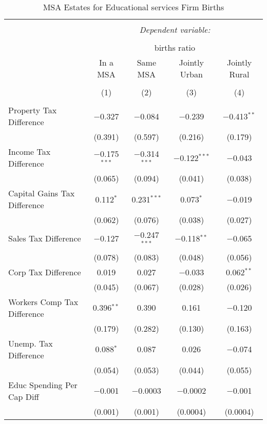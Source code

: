 
\begin{table}[!htbp] \centering 
  \caption{MSA Estates for  Educational services Firm Births} 
  \label{} 
\begin{tabular}{@{\extracolsep{5pt}}lcccc} 
\\[-1.8ex]\hline 
\hline \\[-1.8ex] 
 & \multicolumn{4}{c}{\textit{Dependent variable:}} \\ 
\cline{2-5} 
\\[-1.8ex] & \multicolumn{4}{c}{births ratio} \\ 
 & In a MSA & Same MSA & Jointly Urban & Jointly Rural \\ 
\\[-1.8ex] & (1) & (2) & (3) & (4)\\ 
\hline \\[-1.8ex] 
 Property Tax Difference & $-$0.327 & $-$0.084 & $-$0.239 & $-$0.413$^{**}$ \\ 
  & (0.391) & (0.597) & (0.216) & (0.179) \\ 
  Income Tax Difference & $-$0.175$^{***}$ & $-$0.314$^{***}$ & $-$0.122$^{***}$ & $-$0.043 \\ 
  & (0.065) & (0.094) & (0.041) & (0.038) \\ 
  Capital Gains Tax Difference & 0.112$^{*}$ & 0.231$^{***}$ & 0.073$^{*}$ & $-$0.019 \\ 
  & (0.062) & (0.076) & (0.038) & (0.027) \\ 
  Sales Tax Difference & $-$0.127 & $-$0.247$^{***}$ & $-$0.118$^{**}$ & $-$0.065 \\ 
  & (0.078) & (0.083) & (0.048) & (0.056) \\ 
  Corp Tax Difference & 0.019 & 0.027 & $-$0.033 & 0.062$^{**}$ \\ 
  & (0.045) & (0.067) & (0.028) & (0.026) \\ 
  Workers Comp Tax Difference & 0.396$^{**}$ & 0.390 & 0.161 & $-$0.120 \\ 
  & (0.179) & (0.282) & (0.130) & (0.163) \\ 
  Unemp. Tax Difference & 0.088$^{*}$ & 0.087 & 0.026 & $-$0.074 \\ 
  & (0.054) & (0.053) & (0.044) & (0.055) \\ 
  Educ Spending Per Cap Diff & $-$0.001 & $-$0.0003 & $-$0.0002 & $-$0.001 \\ 
  & (0.001) & (0.001) & (0.0004) & (0.0004) \\ 

\end{tabular}
\end{table}
